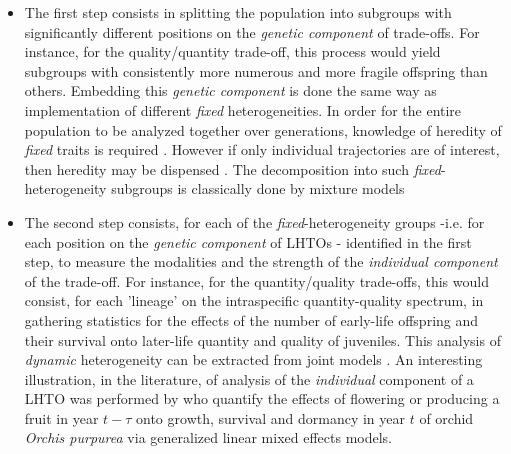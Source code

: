 \documentclass[10pt,a4paper]{article}
\begin{document}
\begin{itemize}
\item The first step consists in splitting the population into subgroups with significantly different positions on the \emph{genetic component} of trade-offs. For instance, for the quality/quantity trade-off, this process would yield subgroups with consistently more numerous and more fragile offspring than others. Embedding this \emph{genetic component} is done the same way as implementation of different \emph{fixed} heterogeneities.
 In order for the entire population to be analyzed together over generations, knowledge of heredity of \emph{fixed} traits is required \citep{Plard2018}. However if only individual trajectories are of interest, then heredity may be dispensed \citep{Jenouvrier2017}.  The decomposition into such \emph{fixed}-heterogeneity subgroups is classically done by mixture models \citep{Hamel2018a} 
\item 
The second step consists, for each of the \emph{fixed}-heterogeneity groups  -i.e. for each position on the \emph{genetic component} of LHTOs - identified in the first step, to measure the modalities and the strength of the \emph{individual component} of the trade-off. For instance, for the quantity/quality trade-offs, this would consist, for each 'lineage' on the intraspecific quantity-quality spectrum, in gathering statistics for the effects of the number of early-life offspring and their survival onto later-life quantity and quality of juveniles. This analysis of \emph{dynamic} heterogeneity can be extracted from joint models \citep{Hamel2018a}.  An interesting illustration, in the literature, of analysis of the \emph{individual} component of a LHTO  was performed by \citet{Miller2012} who quantify the effects of flowering or producing a fruit in year $t-\tau$ onto growth, survival and dormancy in year $t$ of orchid \textit{Orchis purpurea} via generalized linear mixed effects models.


\end{itemize}
\end{document}
